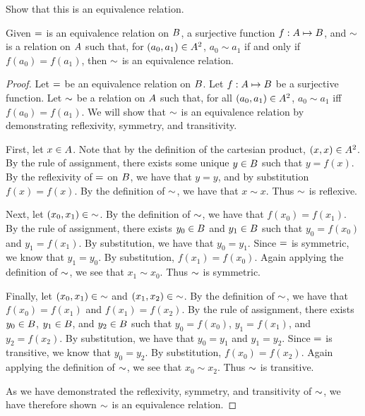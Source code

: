 \documentclass[main.tex]{subfiles}
\begin{document}
\subproblem{}\label{s03p04a}

Show that this is an equivalence relation.

\begin{thm}
	Given \({=}\) is an equivalence relation on \({B}\),
	a surjective function \({f}: {{A}} \mapsto{} {{B}}\), and
	\({\sim}\) is a relation on \({A}\) such that, for
	\(({a_0},{a_1}) \in {{A}^2}\), \({a_0} \sim {a_1}\) if and
	only if \(f(a_0) = f(a_1)\), then \({\sim}\) is an
	equivalence relation.
\end{thm}
\begin{proof}
	Let \({=}\) be an equivalence relation on \({B}\).
	Let \({f}: {{A}} \mapsto{} {{B}}\) be a surjective function.
	Let \({\sim}\) be a relation on \({A}\) such that,
	for all \(({a_0},{a_1}) \in {{A}^2}\), \({a_0} \sim {a_1}\)
	iff \(f(a_0) = f(a_1)\). We will show that \({\sim}\) is an
	equivalence relation by demonstrating reflexivity, symmetry, and
	transitivity.

	First, let \(x \in {A}\). Note that by the definition of the
	cartesian product, \(({x},{x}) \in {{A}^2}\). By the rule
	of assignment, there exists some unique \(y \in {B}\) such that
	\(y = f(x)\). By the reflexivity of \({=}\) on
	\({B}\), we have that \(y = y\), and by substitution
	\(f(x) = f(x)\). By the definition of \({\sim}\), we have
	that \(x \sim x\). Thus \({\sim}\) is reflexive.

	Next, let \(({x_0},{x_1}) \in {\sim}\). By the
	definition of \({\sim}\), we have that \(f(x_0) = f(x_1)\).
	By the rule of assignment, there exists \({y_0} \in {B}\) and
	\({y_1} \in {B}\) such that \({y_0} = f(x_0)\) and
	\({y_1} = f(x_1)\). By substitution, we have that \({y_0} = {y_1}\).
	Since \({=}\) is symmetric, we know that \({y_1} = {y_0}\).
	By substitution, \(f(x_1) = f(x_0)\). Again applying the definition of
	\({\sim}\), we see that \({x_1} \sim {x_0}\). Thus
	\({\sim}\) is symmetric.

	Finally, let \(({x_0},{x_1}) \in {\sim}\) and
	\(({x_1},{x_2}) \in {\sim}\). By the definition of
	\({\sim}\), we have that \(f(x_0) = f(x_1)\) and
	\(f(x_1) = f(x_2)\). By the rule of assignment, there exists
	\({y_0} \in {B}\), \({y_1} \in {B}\), and
	\({y_2} \in {B}\) such that \({y_0} = f(x_0)\),
	\({y_1} = f(x_1)\), and \({y_2} = f(x_2)\). By substitution, we have
	that \({y_0} = {y_1}\) and \({y_1} = {y_2}\). Since \({=}\)
	is transitive, we know that \({y_0} = {y_2}\). By substitution,
	\(f(x_0) = f(x_2)\). Again applying the definition of
	\({\sim}\), we see that \({x_0} \sim {x_2}\). Thus
	\({\sim}\) is transitive.

	As we have demonstrated the reflexivity, symmetry, and transitivity of
	\({\sim}\), we have therefore shown \({\sim}\)
	is an equivalence relation.
\end{proof}
\end{document}
